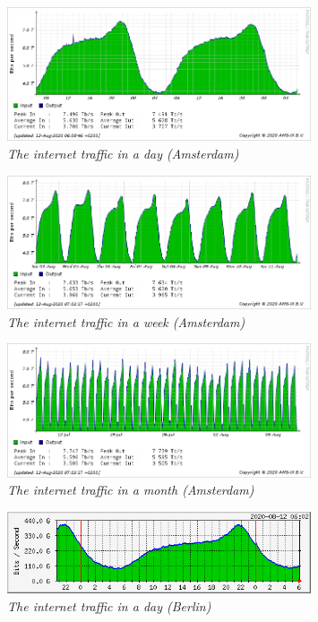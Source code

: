 \begin{figure}[hbt!]
    \centering
    \includegraphics[width=0.8\textwidth]{figure/amsterdam-day.png}
    \caption{\em The internet traffic in a day (Amsterdam) \cite{Amsterdam_internet_traffic} \label{fig:internet_traffic_day_Amsterdam}}
\end{figure}

\begin{figure}[hbt!]    
    \centering
    \includegraphics[width=0.8\textwidth]{figure/amsterdam-week.png}
    \caption{\em The internet traffic in a week (Amsterdam) \cite{Amsterdam_internet_traffic} \label{fig:internet_traffic_week_Amsterdam}}
\end{figure}

\begin{figure}[hbt!]  
    \centering
    \includegraphics[width=0.8\textwidth]{figure/amsterdam-month.png}
    \caption{\em The internet traffic in a month (Amsterdam) \cite{Amsterdam_internet_traffic} \label{fig:internet_traffic_month_Amsterdam}}
\end{figure}

\begin{figure}[hbt!]
    \centering
    \includegraphics[width=0.8\textwidth]{figure/berlin-day.png}
    \caption{\em The internet traffic in a day (Berlin) \cite{Amsterdam_internet_traffic} \label{fig:internet_traffic_day_Berlin}}
\end{figure}

